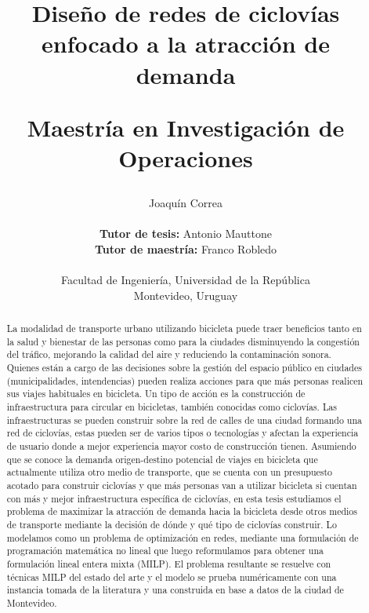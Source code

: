 \documentclass{article}
\begin{document}
  \title{
    Diseño de redes de ciclovías enfocado a la atracción de demanda

    {\sc \large Maestría en Investigación de Operaciones}
    \linebreak
  }
  \author{
    Joaquín Correa \\
    \\
    {\small \textbf{ Tutor de tesis:} Antonio Mauttone} \\
    {\small \textbf{ Tutor de maestría:} Franco Robledo} \\
    \\
    {\small Facultad de Ingeniería, Universidad de la República} \\

    {\small Montevideo, Uruguay}
  }
  \maketitle

  \newpage
  \tableofcontents

  \newpage
  \begin{abstract}
    La modalidad de transporte urbano utilizando bicicleta puede traer beneficios tanto en la salud y bienestar de las personas como para la ciudades disminuyendo la congestión del tráfico, mejorando la calidad del aire y reduciendo la contaminación sonora. Quienes están a cargo de las decisiones sobre la gestión del espacio público en ciudades (municipalidades, intendencias) pueden realiza acciones para que más personas realicen sus viajes habituales en bicicleta. Un tipo de acción es la construcción de infraestructura para circular en bicicletas, también conocidas como ciclovías. Las infraestructuras se pueden construir sobre la red de calles de una ciudad formando una red de ciclovías, estas pueden ser de varios tipos o tecnologías y afectan la experiencia de usuario donde a mejor experiencia mayor costo de construcción tienen. Asumiendo que se conoce la demanda origen-destino potencial de viajes en bicicleta que actualmente utiliza otro medio de transporte, que se cuenta con un presupuesto acotado para construir ciclovías y que más personas van a utilizar bicicleta si cuentan con más y mejor infraestructura específica de ciclovías, en esta tesis estudiamos el problema de maximizar la atracción de demanda hacia la bicicleta desde otros medios de transporte mediante la decisión de dónde y qué tipo de ciclovías construir. Lo modelamos como un problema de optimización en redes, mediante una formulación de programación matemática no lineal que luego reformulamos para obtener una formulación lineal entera mixta (MILP). El problema resultante se resuelve con técnicas MILP del estado del arte y el modelo se prueba numéricamente con una instancia tomada de la literatura y una construida en base a datos de la ciudad de Montevideo.
  \end{abstract}
\end{document}

